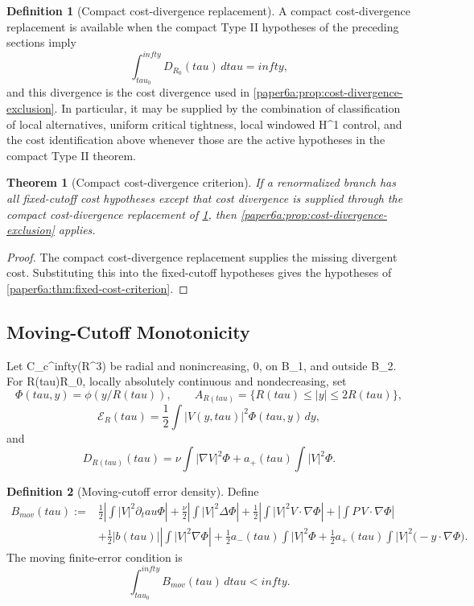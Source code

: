 \documentclass[11pt]{amsart}
\def\({}%
\def\){}%
\def\tilde#1{#1}%
\def\mathfrak#1{#1}%
\def\mathrm#1{#1}%
\def\mathbb#1{#1}%
\def\tau{tau}%
\def\infty{infty}%
\theoremstyle{plain}
\newtheorem{theorem}{Theorem}[section]
\theoremstyle{definition}
\newtheorem{definition}[definition]{Definition}
\theoremstyle{remark}
\begin{document}
\begin{definition}[Compact cost-divergence replacement]\label{paper6a:def:compact-cost-replacement}
A compact cost-divergence replacement is available when the compact Type II hypotheses
of the preceding sections imply
\[
  \int_{\tau_0}^{\infty}\tilde{\mathfrak D}_{R_0}(\tau)\,d\tau=\infty,
\]
and this divergence is the cost divergence used in
\cref{paper6a:prop:cost-divergence-exclusion}.  In particular, it may be
supplied by the combination of classification of local alternatives, uniform
critical tightness, local windowed \(H^1\) control, and the cost identification
above whenever those are the active hypotheses in the compact Type II theorem.
\end{definition}

\begin{theorem}[Compact cost-divergence criterion]\label{paper6a:thm:compact-cost-criterion}
If a renormalized branch has all fixed-cutoff cost hypotheses except that cost
divergence is supplied through the compact cost-divergence replacement of
\cref{paper6a:def:compact-cost-replacement}, then
\cref{paper6a:prop:cost-divergence-exclusion} applies.
\end{theorem}

\begin{proof}
The compact cost-divergence replacement supplies the missing divergent cost.
Substituting this into the fixed-cutoff hypotheses gives the hypotheses of
\cref{paper6a:thm:fixed-cost-criterion}.
\end{proof}

\subsection{Moving-Cutoff Monotonicity}

Let \(\phi\in C_c^\infty(\mathbb R^3)\) be radial and nonincreasing,
\(0\le\phi{}\), \(\) on \(B_1\), and \(\) outside \(B_2\).  For
\(R(\tau)\ge R_0\), locally absolutely continuous and nondecreasing, set
\[
  \Phi(\tau,y)=\phi(y/R(\tau)),\qquad
  A_{R(\tau)}=\{R(\tau)\le |y|\le2R(\tau)\},
\]
\[
  \mathcal E_R(\tau)=\frac12\int |V(y,\tau)|^2\Phi(\tau,y)\,dy,
\]
and
\[
  \tilde{\mathfrak D}_{R(\tau)}(\tau)
  =
  \nu\int|\nabla V|^2\Phi
  +a_+(\tau)\int|V|^2\Phi .
\]

\begin{definition}[Moving-cutoff error density]\label{paper6a:def:moving-error-density}
Define
\begin{align*}
  B_{\mathrm{mov}}(\tau)
  :={}&
  \frac12\left|\int |V|^2\partial_\tau\Phi\right|
  +\frac{\nu}{2}\left|\int |V|^2\Delta\Phi\right|
  +\frac12\left|\int |V|^2V\cdot\nabla\Phi\right|
  +\left|\int P\,V\cdot\nabla\Phi\right|\\
  &+\frac12|b(\tau)|\left|\int |V|^2\nabla\Phi\right|
  +\frac12a_-(\tau)\int |V|^2\Phi
  +\frac12a_+(\tau)\int |V|^2\bigl(-y\cdot\nabla\Phi\bigr).
\end{align*}
The moving finite-error condition is
\[
  \int_{\tau_0}^{\infty}B_{\mathrm{mov}}(\tau)\,d\tau<\infty .
\]
\end{definition}
\end{document}
